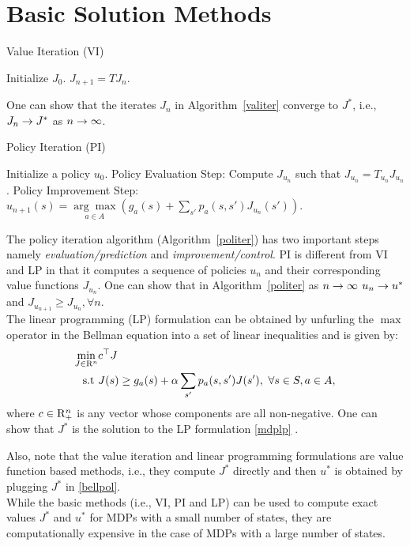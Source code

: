 \section{Basic Solution Methods} 
\FloatBarrier 
\begin{algorithm}[H]
\caption{Value Iteration (VI)}
\begin{algorithmic}[1]
\STATE Initialize $J_0$.
\STATE $J_{n+1}=TJ_{n}$.
\ENDFOR 
\end{algorithmic}
\label{valiter}
\end{algorithm}
One can show that the iterates $J_n$ in Algorithm~\ref{valiter} converge to $J^*$, i.e., $J_n\rightarrow J^*$ as $n\rightarrow \infty$.\\
\FloatBarrier 
\begin{algorithm}[H]
\caption{Policy Iteration (PI)}
\begin{algorithmic}[1]
\STATE Initialize a policy $u_0$.
\STATE Policy Evaluation Step: Compute $J_{u_n}$ such that $J_{u_n}= T_{u_n}J_{u_n}$.
\STATE Policy Improvement Step: $u_{n+1}(s)=\underset{a \in A}{\arg\max}(g_a(s)+\sum_{s'}p_a(s,s')J_{u_n}(s'))$.
\ENDFOR
\end{algorithmic}
\label{politer}
\end{algorithm}
The policy iteration algorithm (Algorithm~\ref{politer}) has two important steps namely \emph{evaluation/prediction} and \emph{improvement/control}. PI is different from VI and LP in that it computes a sequence of policies $u_n$ and their corresponding value functions $J_{u_n}$.  One can show that in Algorithm~\ref{politer} as $n\rightarrow \infty$ $u_n \rightarrow u^*$ and $J_{u_{n+1}}\geq J_{u_n}, \forall n$.\\
The linear programming (LP) formulation can be obtained by unfurling the $\max$ operator in the Bellman equation into a set of linear inequalities and is given by:
\small
\begin{align}\label{mdplp}
\min_{J\in \mathrm{R}^n} &c^\top J\nonumber\\
\text{s.t}\mbox{ } &J(s)\geq g_a(s)+\alpha\sum_{s'}p_a(s,s')J(s'), \mbox{ }\forall s\in S, a \in A,
\end{align}
\normalsize
where $c\in \mathrm{R}^n_+$ is any vector whose components are all non-negative. One can show that $J^*$ is the solution to the LP formulation \eqref{mdplp} \cite{BertB}. 
\begin{comment}
The LP formulation in \eqref{mdplp} can be represented in short as,
\begin{align}\label{mdplpshort}
\min_{J\in \R^n} &c^\top J\nn\\
\text{s.t}\mb &J\geq T J.
\end{align}
\end{comment}
Also, note that the value iteration and linear programming formulations are value function based methods, i.e., they compute $J^*$ directly and then $u^*$ is obtained by plugging $J^*$ in \eqref{bellpol}.\\
While the basic methods (i.e., VI, PI and LP) can be used to compute exact values $J^*$ and $u^*$ for MDPs with a small number of states, they are computationally expensive in the case of MDPs with a large number of states.\\

